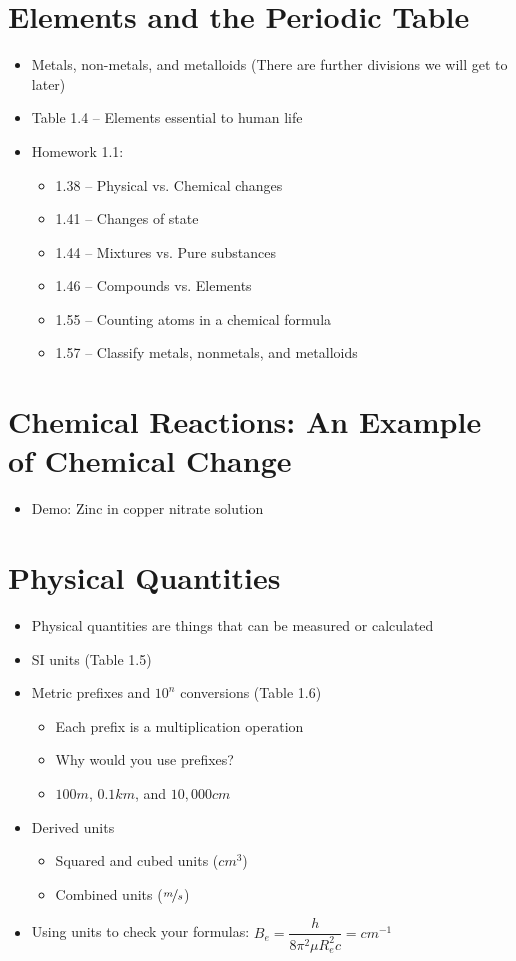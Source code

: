 \documentclass[12pt, openany, letterpaper]{memoir}
\begin{document}
\section{Elements and the Periodic Table}
\begin{itemize}
	\item Metals, non-metals, and metalloids (There are further divisions we will get to later)
	\item Table 1.4 -- Elements essential to human life
	\item Homework 1.1:
	\begin{itemize}
		\item 1.38 -- Physical vs. Chemical changes
		\item 1.41 -- Changes of state
		\item 1.44 -- Mixtures vs. Pure substances
		\item 1.46 -- Compounds vs. Elements
		\item 1.55 -- Counting atoms in a chemical formula
		\item 1.57 -- Classify metals, nonmetals, and metalloids
	\end{itemize}
	
\end{itemize}

\section{Chemical Reactions: An Example of Chemical Change}
\begin{itemize}
	\item Demo: Zinc in copper nitrate solution
\end{itemize}

\section{Physical Quantities}
\begin{itemize}
	\item Physical quantities are things that can be measured or calculated
	\item SI units (Table 1.5)
	\item Metric prefixes and $10^n$ conversions (Table 1.6)
	\begin{itemize}		
		\item Each prefix is a multiplication operation
		\item Why would you use prefixes?
		\item $100m$, $0.1km$, and $10,000cm$
	\end{itemize}
	\item Derived units
	\begin{itemize}
		\item Squared and cubed units ($cm^3$)
		\item Combined units ($\nicefrac{m}{s}$)
	\end{itemize}
	\item Using units to check your formulas: $B_e = \dfrac{h}{8\pi^2\mu R_e^2c}=cm^{-1}$
\end{itemize}
\end{document}
